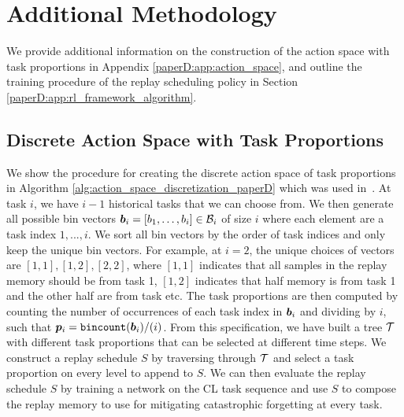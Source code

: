 
\section{Additional Methodology}\label{paperD:app:methodology}

We provide additional information on the construction of the action space with task proportions in Appendix \ref{paperD:app:action_space}, and outline the training procedure of the replay scheduling policy in Section \ref{paperD:app:rl_framework_algorithm}. 

\subsection*{Discrete Action Space with Task Proportions}\label{paperD:app:action_space}

We show the procedure for creating the discrete action space of task proportions in Algorithm \ref{alg:action_space_discretization_paperD} which was used in~. At task $i$, we have $i-1$ historical tasks that we can choose from. We then generate all possible bin vectors ${\bm{b}}_i = [b_1, \dots, b_{i}] \in {\mathcal{B}}_i$ of size $i$ where each element are a task index $1, ..., i$. We sort all bin vectors by the order of task indices and only keep the unique bin vectors. For example, at $i=2$, the unique choices of vectors are $[1,1], [1,2], [2,2]$, where $[1,1]$ indicates that all samples in the replay memory should be from task 1, $[1,2]$ indicates that half memory is from task 1 and the other half are from task etc. The task proportions are then computed by counting the number of occurrences of each task index in ${\bm{b}}_i$ and dividing by $i$, such that ${\bm{p}}_i = \texttt{bincount}({\bm{b}}_i) / (i)$. From this specification, we have built a tree ${\mathcal{T}}$ with different task proportions that can be selected at different time steps. We construct a replay schedule $S$ by traversing through ${\mathcal{T}}$ and select a task proportion on every level to append to $S$. We can then evaluate the replay schedule $S$ by training a network on the CL task sequence and use $S$ to compose the replay memory to use for mitigating catastrophic forgetting at every task. 

